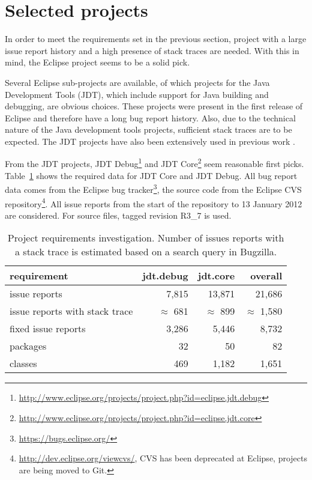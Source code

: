 
\section{Selected projects} %
\label{sec:selected_projects}
In order to meet the requirements set in the previous section, project with a large issue report history and a high presence of stack traces are needed. With this in mind, the Eclipse project seems to be a solid pick.

Several Eclipse sub-projects are available, of which projects for the Java Development Tools (JDT), which include support for Java building and debugging, are obvious choices. These projects were present in the first release of Eclipse and therefore have a long bug report history. Also, due to the technical nature of the Java development tools projects, sufficient stack traces are to be  expected. The JDT projects have also been extensively used in previous work \cite{Gall2009,Giger2010,Lamkanfi2010,D'Ambros2010,Bettenburg2008a}.

From the JDT projects, JDT Debug\footnote{\url{http://www.eclipse.org/projects/project.php?id=eclipse.jdt.debug}} and JDT Core\footnote{\url{http://www.eclipse.org/projects/project.php?id=eclipse.jdt.core}} seem reasonable first picks.
Table~\ref{tab:project-requirements} shows the required data for JDT Core and JDT Debug. All bug report data comes from the Eclipse bug tracker\footnote{\url{https://bugs.eclipse.org/}}, the source code from the Eclipse CVS repository\footnote{\url{http://dev.eclipse.org/viewcvs/}, CVS has been deprecated at Eclipse, projects are being moved to Git.}. All issue reports from the start of the repository to 13 January 2012 are considered. For source files, tagged revision R3\_7 is used.

\begin{table}[!ht]\footnotesize
	\centering
	\begin{tabular}{lrrr}
		\toprule
		requirement & jdt.debug & jdt.core & overall \\
		\midrule
		issue reports & 7,815 & 13,871 & 21,686\\
		issue reports with stack trace & $\approx$ 681 & $\approx$ 899 & $\approx$ 1,580 \\
		fixed issue reports & 3,286 & 5,446 & 8,732 \\
		packages & 32 & 50 & 82 \\
		classes & 469 & 1,182 & 1,651 \\
		\bottomrule
	\end{tabular} 
	\caption{Project requirements investigation. Number of issues reports with a stack trace is estimated based on a search query in Bugzilla.}
	\label{tab:project-requirements}
\end{table}

